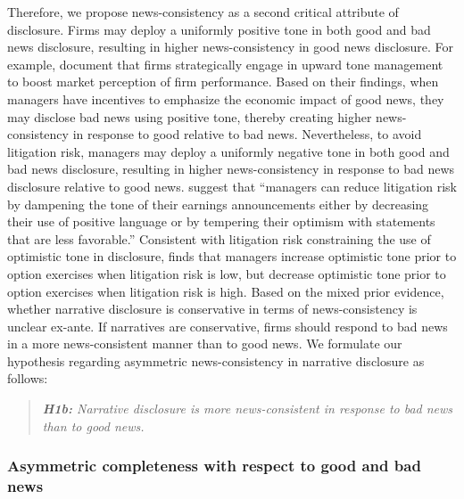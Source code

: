 \documentclass[letterpaper,12pt]{article}
\begin{document}
\begin{spacing}{1.5}
Therefore, we propose news-consistency as a second critical attribute of disclosure. Firms may deploy a uniformly positive tone in both good and bad news disclosure, resulting in higher news-consistency in good news disclosure. For example,  document that firms strategically engage in upward tone management to boost market perception of firm performance. Based on their findings, when managers have incentives to emphasize the economic impact of good news, they may disclose bad news using positive tone, thereby creating higher news-consistency in response to good relative to bad news. Nevertheless, to avoid litigation risk, managers may deploy a uniformly negative tone in both good and bad news disclosure, resulting in higher news-consistency in response to bad news disclosure relative to good news.  suggest that ``managers can reduce litigation risk by dampening the tone of their earnings announcements either by decreasing their use of positive language or by tempering their optimism with statements that are less favorable.'' Consistent with litigation risk constraining the use of optimistic tone in disclosure,  finds that managers increase optimistic tone prior to option exercises when litigation risk is low, but decrease optimistic tone prior to option exercises when litigation risk is high. Based on the mixed prior evidence, whether narrative disclosure is conservative in terms of news-consistency is unclear ex-ante. If narratives are conservative, firms should respond to bad news in a more news-consistent manner than to good news. We formulate our hypothesis regarding asymmetric news-consistency in narrative disclosure as follows:

\begin{quote}\label{hyp:h1b}
	\textit{\textbf{H1b:} Narrative disclosure is more news-consistent in response to bad news than to good news.}
\end{quote}

\subsubsection{Asymmetric completeness with respect to good and bad news}


\end{spacing}
\end{document}
